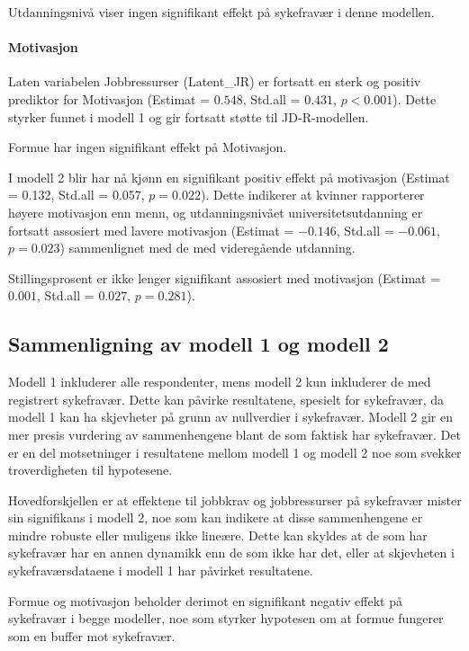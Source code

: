 \documentclass[
  12pt,
  a4paper,
  DIV=11,
  numbers=noendperiod]{scrartcl}
\let\oldparagraph\paragraph
\renewcommand{\paragraph}[1]{\oldparagraph{#1}\mbox{}}
\begin{document}
Utdanningsnivå viser ingen signifikant effekt på sykefravær i denne
modellen.

\paragraph{Motivasjon}\label{motivasjon-2}

Laten variabelen Jobbressurser (Latent\_JR) er fortsatt en sterk og
positiv prediktor for Motivasjon (Estimat = \(0.548\), Std.all =
\(0.431\), \(p < 0.001\)). Dette styrker funnet i modell 1 og gir
fortsatt støtte til JD-R-modellen.

Formue har ingen signifikant effekt på Motivasjon.

I modell 2 blir har nå kjønn en signifikant positiv effekt på motivasjon
(Estimat = 0.132, Std.all = 0.057, \(p = 0.022\)). Dette indikerer at
kvinner rapporterer høyere motivasjon enn menn, og utdanningsnivået
universitetsutdanning er fortsatt assosiert med lavere motivasjon
(Estimat = \(-0.146\), Std.all = \(-0.061\), \(p = 0.023\)) sammenlignet
med de med videregående utdanning.

Stillingsprosent er ikke lenger signifikant assosiert med motivasjon
(Estimat = \(0.001\), Std.all = \(0.027\), \(p = 0.281\)).

\subsection{Sammenligning av modell 1 og modell
2}\label{sammenligning-av-modell-1-og-modell-2}

Modell 1 inkluderer alle respondenter, mens modell 2 kun inkluderer de
med registrert sykefravær. Dette kan påvirke resultatene, spesielt for
sykefravær, da modell 1 kan ha skjevheter på grunn av nullverdier i
sykefravær. Modell 2 gir en mer presis vurdering av sammenhengene blant
de som faktisk har sykefravær. Det er en del motsetninger i resultatene
mellom modell 1 og modell 2 noe som svekker troverdigheten til
hypotesene.

Hovedforskjellen er at effektene til jobbkrav og jobbressurser på
sykefravær mister sin signifikans i modell 2, noe som kan indikere at
disse sammenhengene er mindre robuste eller muligens ikke lineære. Dette
kan skyldes at de som har sykefravær har en annen dynamikk enn de som
ikke har det, eller at skjevheten i sykefraværsdataene i modell 1 har
påvirket resultatene.

Formue og motivasjon beholder derimot en signifikant negativ effekt på
sykefravær i begge modeller, noe som styrker hypotesen om at formue
fungerer som en buffer mot sykefravær.
\end{document}

